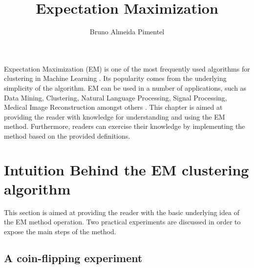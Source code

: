 \title{Expectation Maximization}
\label{chp:label}
\author{Bruno Almeida Pimentel}




\maketitle



Expectation Maximization (EM) is one of the most frequently used algorithms for clustering in Machine Learning \cite{moon1996expectation, do2008expectation}. Its popularity comes from the underlying simplicity of the algorithm. EM can be used in a number of applications, such as Data Mining, Clustering, Natural Language Processing, Signal Processing, Medical Image Reconstruction amongst others \cite{dellaert2002expectation, dempster1977maximum, ceppellini1955estimation, tzoreff2017expectation, li2019expectation}. This chapter is aimed at providing the reader with knowledge for understanding and using the EM method. Furthermore, readers can exercise their knowledge by implementing the method based on the provided definitions. 



\section{Intuition Behind the EM clustering algorithm}

This section is aimed at providing the reader with the basic underlying idea of the EM method operation. Two practical experiments are discussed in order to expose the main steps of the method.

\subsection{A coin-flipping experiment}
\label{sec:coin}

